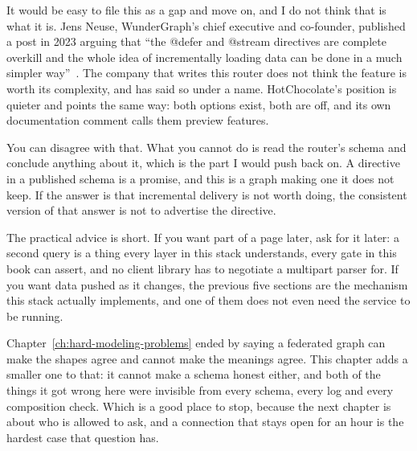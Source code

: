 %
It would be easy to file this as a gap and move on, and I do not think that is
what it is. Jens Neuse, WunderGraph's chief executive and co-founder, published
a post in 2023 arguing that \enquote{the @defer and @stream directives are
complete overkill and the whole idea of incrementally loading data can be done
in a much simpler way}~\autocite{neuse2023defer}. The company that writes this
router does not think the feature is worth its complexity, and has said so
under a name. HotChocolate's position is quieter and points the same way: both
options exist, both are off, and its own documentation comment calls them
preview features.

You can disagree with that. What you cannot do is read the router's schema and
conclude anything about it, which is the part I would push back on. A directive
in a published schema is a promise, and this is a graph making one it does not
keep. If the answer is that incremental delivery is not worth doing, the
consistent version of that answer is not to advertise the directive.

%
The practical advice is short. If you want part of a page later, ask for it
later: a second query is a thing every layer in this stack understands, every
gate in this book can assert, and no client library has to negotiate a
multipart parser for. If you want data pushed as it changes, the previous five
sections are the mechanism this stack actually implements, and one of them does
not even need the service to be running.

\medskip
Chapter~\ref{ch:hard-modeling-problems} ended by saying a federated graph can
make the shapes agree and cannot make the meanings agree. This chapter adds a
smaller one to that: it cannot make a schema honest either, and both of the
things it got wrong here were invisible from every schema, every log and every
composition check. Which is a good place to stop, because the next chapter is
about who is allowed to ask, and a connection that stays open for an hour is
the hardest case that question has.

%
